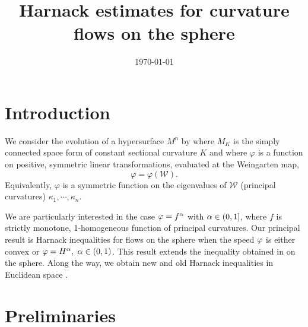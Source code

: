 \documentclass{amsart}
\begin{document}
\title[]
 {Harnack estimates for curvature flows on the sphere}

\curraddr{}
\email{}
\date{\today}

\dedicatory{}
\subjclass[2010]{}
\keywords{}

\begin{abstract}
\end{abstract}

\maketitle

\section{Introduction}

We consider the evolution of a hypersurface $M^n$ by
\eq{\label{Flow}
\partial_tx=-\varphi\nu,~ x:M^n\times[0,T)\to M_K,
}
where \(M_K\) is the simply connected space form of constant sectional curvature \(K\) and where $\varphi$ is a function on positive, symmetric linear transformations, evaluated at the Weingarten map,
\[
\varphi = \varphi(\mathcal{W}).
\]
Equivalently, \(\varphi\) is a symmetric function on the eigenvalues of \(\mathcal{W}\) (principal curvatures) \(\kappa_1, \cdots, \kappa_n\).

We are particularly interested in the case \(\varphi = f^{\alpha}\) with $\alpha\in (0,1]$, where \(f\) is strictly monotone, 1-homogeneous function of principal curvatures. Our principal result is Harnack inequalities for flows on the sphere when the speed $\varphi$ is either convex or $\varphi=H^{\alpha},~ \alpha\in (0,1)$. This result extends the inequality obtained in \cite{2015arXiv150802821B, bryanlouie} on the sphere. Along the way, we obtain new and old Harnack inequalities in Euclidean space \cite{MR1296393, MR1100812, MR1316556, MR2813400, MR1480081}.

\section{Preliminaries}
\end{document}
